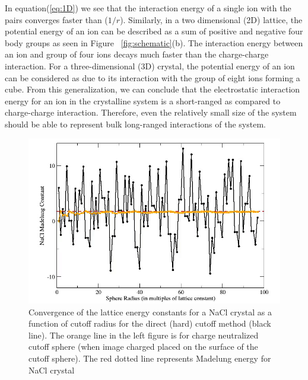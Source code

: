 In equation(\ref{eq:1D}) we see that the interaction energy of a single ion with the pairs converges faster than ($1/r$). Similarly, in a two dimensional (2D) lattice, the potential energy of an ion can be described as a sum of positive and negative four body groups as seen in Figure ~\ref{fig:schematic}(b). The interaction energy between an ion and group of four ions decays much faster than the charge-charge interaction. For a three-dimensional (3D) crystal, the potential energy of an ion can be considered as due to its interaction with the group of eight ions forming a cube. From this generalization, we can conclude that the electrostatic interaction energy for an ion in the crystalline system is a short-ranged as compared to charge-charge interaction. Therefore, even the relatively small size of the system should be able to represent bulk long-ranged interactions of the system.
\begin{figure}[tpb]
  \begin{center}
    \centerline{\includegraphics[scale=0.8]{energyVsCutoff.png}}
    \caption{Convergence of the lattice energy constants for a NaCl crystal as a function of cutoff radius for the direct (hard) cutoff method (black line). The orange line in the left figure is for charge neutralized cutoff sphere (when image charged placed on the surface of the cutoff sphere). The red dotted line represents Madelung energy for NaCl crystal}
    \label{fig:energyVsCutoff}
  \end{center}
\end{figure}

